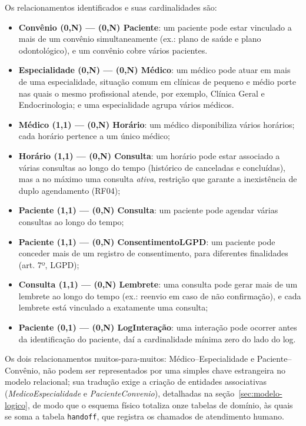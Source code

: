 \documentclass[12pt,a4paper]{extarticle}
\begin{document}
Os relacionamentos identificados e suas cardinalidades são:

\begin{itemize}
    \item \textbf{Convênio (0,N) --- (0,N) Paciente}: um paciente pode estar vinculado a mais de um convênio simultaneamente (ex.: plano de saúde e plano odontológico), e um convênio cobre vários pacientes.
    \item \textbf{Especialidade (0,N) --- (0,N) Médico}: um médico pode atuar em mais de uma especialidade, situação comum em clínicas de pequeno e médio porte nas quais o mesmo profissional atende, por exemplo, Clínica Geral e Endocrinologia; e uma especialidade agrupa vários médicos.
    \item \textbf{Médico (1,1) --- (0,N) Horário}: um médico disponibiliza vários horários; cada horário pertence a um único médico;
    \item \textbf{Horário (1,1) --- (0,N) Consulta}: um horário pode estar associado a várias consultas ao longo do tempo (histórico de canceladas e concluídas), mas a no máximo uma consulta \textit{ativa}, restrição que garante a inexistência de duplo agendamento (RF04);
    \item \textbf{Paciente (1,1) --- (0,N) Consulta}: um paciente pode agendar várias consultas ao longo do tempo;
    \item \textbf{Paciente (1,1) --- (0,N) ConsentimentoLGPD}: um paciente pode conceder mais de um registro de consentimento, para diferentes finalidades (art. 7º, LGPD);
    \item \textbf{Consulta (1,1) --- (0,N) Lembrete}: uma consulta pode gerar mais de um lembrete ao longo do tempo (ex.: reenvio em caso de não confirmação), e cada lembrete está vinculado a exatamente uma consulta;
    \item \textbf{Paciente (0,1) --- (0,N) LogInteração}: uma interação pode ocorrer antes da identificação do paciente, daí a cardinalidade mínima zero do lado do log.
\end{itemize}

Os dois relacionamentos muitos-para-muitos: Médico–Especialidade e Paciente–Convênio, não podem ser representados por uma simples chave estrangeira no modelo relacional; sua tradução exige a criação de entidades associativas (\textit{MedicoEspecialidade} e \textit{PacienteConvenio}), detalhadas na seção~\ref{sec:modelo-logico}, de modo que o esquema físico totaliza onze tabelas de domínio, às quais se soma a tabela \texttt{handoff}, que registra os chamados de atendimento humano.
\end{document}
